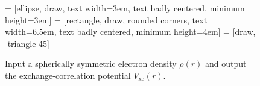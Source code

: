 \begin{figure}[h!]
\centering
\footnotesize
\usetikzlibrary{shapes,arrows}
 = [ellipse, draw, text width=3em, text badly centered, minimum height=3em]
 = [rectangle, draw, rounded corners, text width=6.5em, text badly centered, minimum height=4em]
  = [draw, -triangle 45]
\caption{Input a spherically symmetric electron density $\rho(r)$ and output
the exchange-correlation potential $V_{\text{xc}}(r)$.}
\label{fig:LDA}
\end{figure}

